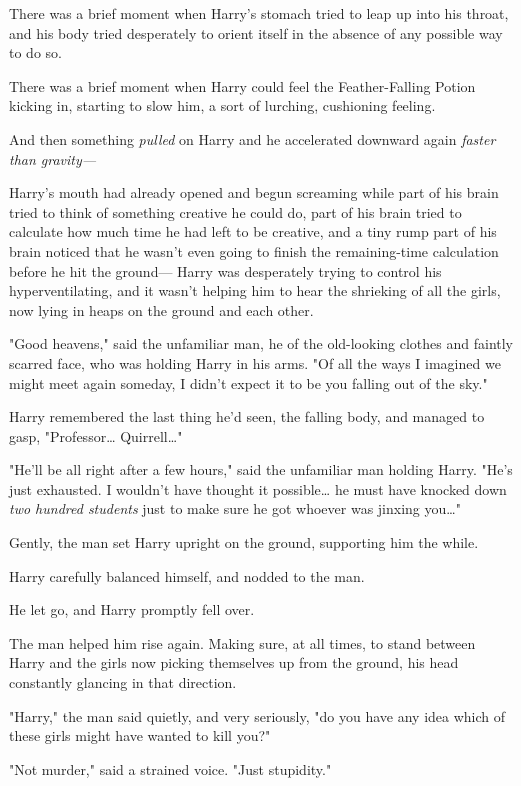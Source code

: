 There was a brief moment when Harry's stomach tried to leap up into his throat, 
and his body tried desperately to orient itself in the absence of any possible 
way to do so.

There was a brief moment when Harry could feel the Feather-Falling Potion 
kicking in, starting to slow him, a sort of lurching, cushioning feeling.

And then something \emph{pulled} on Harry and he accelerated downward again 
\emph{faster than gravity---}

Harry's mouth had already opened and begun screaming while part of his brain 
tried to think of something creative he could do, part of his brain tried to 
calculate how much time he had left to be creative, and a tiny rump part of his 
brain noticed that he wasn't even going to finish the remaining-time 
calculation before he hit the ground---
\sbreak
Harry was desperately trying to control his hyperventilating, and it wasn't 
helping him to hear the shrieking of all the girls, now lying in heaps on the 
ground and each other.

"Good heavens," said the unfamiliar man, he of the old-looking clothes and 
faintly scarred face, who was holding Harry in his arms. "Of all the ways I 
imagined we might meet again someday, I didn't expect it to be you falling out 
of the sky."

Harry remembered the last thing he'd seen, the falling body, and managed to 
gasp, "Professor{\ldots} Quirrell{\ldots}"

"He'll be all right after a few hours," said the unfamiliar man holding Harry. 
"He's just exhausted. I wouldn't have thought it possible{\ldots} he must have 
knocked down \emph{two hundred students} just to make sure he got whoever was 
jinxing you{\ldots}"

Gently, the man set Harry upright on the ground, supporting him the while.

Harry carefully balanced himself, and nodded to the man.

He let go, and Harry promptly fell over.

The man helped him rise again. Making sure, at all times, to stand between 
Harry and the girls now picking themselves up from the ground, his head 
constantly glancing in that direction.

"Harry," the man said quietly, and very seriously, "do you have any idea which 
of these girls might have wanted to kill you?"

"Not murder," said a strained voice. "Just stupidity."

